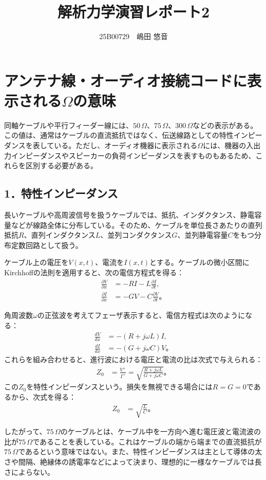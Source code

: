\documentclass[platex,dvipdfmx,a4paper]{jsarticle}
\title{解析力学演習レポート2}
\author{25B00729　嶋田 悠音}
\newcommand{\hb}[2]{\frac{\partial #1}{\partial #2}}
\newcommand{\bbn}[2]{\frac{d #1}{d #2}}
\begin{document}
\maketitle

\section*{アンテナ線・オーディオ接続コードに表示される$\Omega$の意味}

同軸ケーブルや平行フィーダー線には、$50\,\Omega$、$75\,\Omega$、$300\,\Omega$などの表示がある。この値は、通常はケーブルの直流抵抗ではなく、伝送線路としての特性インピーダンスを表している。ただし、オーディオ機器に表示される$\Omega$には、機器の入出力インピーダンスやスピーカーの負荷インピーダンスを表すものもあるため、これらを区別する必要がある。

\subsection*{1．特性インピーダンス}

長いケーブルや高周波信号を扱うケーブルでは、抵抗、インダクタンス、静電容量などが線路全体に分布している。そのため、ケーブルを単位長さあたりの直列抵抗$R$、直列インダクタンス$L$、並列コンダクタンス$G$、並列静電容量$C$をもつ分布定数回路として扱う。

ケーブル上の電圧を$V(x,t)$、電流を$I(x,t)$とする。ケーブルの微小区間にKirchhoffの法則を適用すると、次の電信方程式を得る：
\begin{align*}
  \hb{V}{x}
  &=-RI-L\hb{I}{t}, \\
  \hb{I}{x}
  &=-GV-C\hb{V}{t}。
\end{align*}

角周波数$\omega$の正弦波を考えてフェーザ表示すると、電信方程式は次のようになる：
\begin{align*}
  \bbn{V}{x}
  &=-(R+j\omega L)I, \\
  \bbn{I}{x}
  &=-(G+j\omega C)V。
\end{align*}
これらを組み合わせると、進行波における電圧と電流の比は次式で与えられる：
\begin{align*}
  Z_0
  &=\frac{V^+}{I^+}
   =\sqrt{\frac{R+j\omega L}{G+j\omega C}}。
\end{align*}
この$Z_0$を特性インピーダンスという。損失を無視できる場合には$R=G=0$であるから、次式を得る：
\begin{align*}
  Z_0
  &=\sqrt{\frac{L}{C}}。
\end{align*}

したがって、$75\,\Omega$のケーブルとは、ケーブル中を一方向へ進む電圧波と電流波の比が$75\,\Omega$であることを表している。これはケーブルの端から端までの直流抵抗が$75\,\Omega$であるという意味ではない。また、特性インピーダンスは主として導体の太さや間隔、絶縁体の誘電率などによって決まり、理想的に一様なケーブルでは長さによらない。
\end{document}
